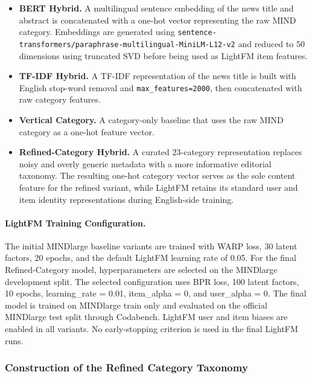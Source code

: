 \documentclass[conference]{IEEEtran}
\begin{document}
\begin{itemize}

\item \textbf{BERT Hybrid.} A multilingual sentence embedding of the news title and abstract is concatenated with a one-hot vector representing the raw MIND category. Embeddings are generated using \texttt{sentence-transformers/paraphrase-multilingual-MiniLM-L12-v2} and reduced to 50 dimensions using truncated SVD before being used as LightFM item features.

\item \textbf{TF-IDF Hybrid.} A TF-IDF representation of the news title is built with English stop-word removal and \texttt{max\_features=2000}, then concatenated with raw category features.

\item \textbf{Vertical Category.} A category-only baseline that uses the raw MIND category as a one-hot feature vector.

\item \textbf{Refined-Category Hybrid.} A curated 23-category representation replaces noisy and overly generic metadata with a more informative editorial taxonomy. The resulting one-hot category vector serves as the sole content feature for the refined variant, while LightFM retains its standard user and item identity representations during English-side training.

\end{itemize}

\paragraph{LightFM Training Configuration.}

The initial MINDlarge baseline variants are trained with WARP loss, 30 latent factors, 20 epochs, and the default LightFM learning rate of 0.05. For the final Refined-Category model, hyperparameters are selected on the MINDlarge development split. The selected configuration uses BPR loss, 100 latent factors, 10 epochs, learning\_rate = 0.01, item\_alpha = 0, and user\_alpha = 0. The final model is trained on MINDlarge train only and evaluated on the official MINDlarge test split through Codabench. LightFM user and item biases are enabled in all variants. No early-stopping criterion is used in the final LightFM runs.

\subsubsection{Construction of the Refined Category Taxonomy}
\label{sec:refined_taxonomy}
\end{document}

